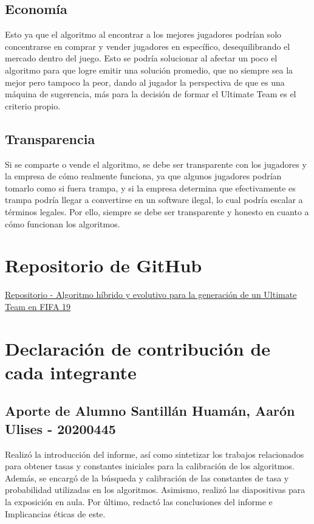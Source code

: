 \documentclass{article}
\begin{document}
\subsection{Economía}

    Esto ya que el algoritmo al encontrar a los mejores jugadores podrían solo concentrarse en comprar y vender jugadores en específico, desequilibrando el mercado dentro del juego. Esto se podría solucionar al afectar un poco el algoritmo para que logre emitir una solución promedio, que no siempre sea la mejor pero tampoco la peor, dando al jugador la perspectiva de que es una máquina de sugerencia, más para la decisión de formar el Ultimate Team es el criterio propio.

\subsection{Transparencia}

    Si se comparte o vende el algoritmo, se debe ser transparente con los jugadores y la empresa de cómo realmente funciona, ya que algunos jugadores podrían tomarlo como si fuera trampa, y si la empresa determina que efectivamente es trampa podría llegar a convertirse en un software ilegal, lo cual podría escalar a términos legales. Por ello, siempre se debe ser transparente y honesto en cuanto a cómo funcionan los algoritmos.

\section{Repositorio de GitHub}

\href{https://github.com/PieroPastor/Algoritmo-hibrido-y-evolutivo-para-la-generacion-de-un-Ultimate-Team-en-FIFA-19.git}{Repositorio - Algoritmo híbrido y evolutivo para la generación de un Ultimate Team en FIFA 19}

\section{Declaración de contribución de cada integrante}
\subsection{Aporte de Alumno Santillán Huamán, Aarón Ulises - 20200445}
Realizó la introducción del informe, así como sintetizar los trabajos relacionados para obtener tasas y constantes iniciales para la calibración de los algoritmos.\newline
Además, se encargó de la búsqueda y calibración de las constantes de tasa y probabilidad utilizadas en los algoritmos. Asimismo, realizó las diapositivas para la exposición en aula.\newline
Por último, redactó las conclusiones del informe e Implicancias éticas de este. 
\end{document}
